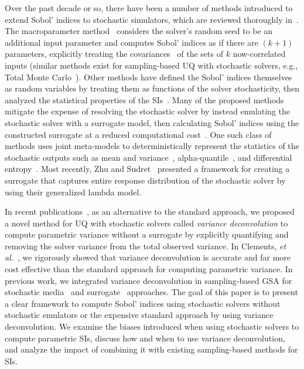 Over the past decade or so, there have been a number of methods introduced to extend Sobol' indices to stochastic simulators, which are reviewed thoroughly in~\cite{zhu-sudret-2021}.
The macroparameter method~\cite{iooss-ribatet-2009} considers the solver's random seed to be an additional input parameter and computes Sobol' indices as if there are $(k+1)$ parameters, explicitly treating the covariances~\cite{daviega-etal-2009} of the sets of $k$ now-correlated inputs (similar methods exist for sampling-based UQ with stochastic solvers, e.g., Total Monte Carlo~\cite{koning-rochman-2008, koning-rochman-2012}). 
Other methods have defined the Sobol' indices themselves as random variables by treating them as functions of the solver stochasticity, then analyzed the statistical properties of the SIs~\cite{hart-etal-2017, jimenez-etal-2017}. 
Many of the proposed methods mitigate the expense of resolving the stochastic solver by instead emulating the stochastic solver with a surrogate model, then calculating Sobol' indices using the constructed surrogate at a reduced computational cost~\cite{zhu-sudret-2021}.
One such class of methods uses joint meta-models to deterministically represent the statistics of the stochastic outputs such as mean and variance~\cite{iooss-ribatet-2009, marrel-etal-2012}, alpha-quantile~\cite{browne-etal-2016}, and differential entropy~\cite{azzi-etal-2020}.
Most recently, Zhu and Sudret~\cite{zhu-sudret-2021} presented a framework for creating a surrogate that captures entire response distribution of the stochastic solver by using their generalized lambda model.

In recent publications~\cite{olson-2019}, as an alternative to the standard approach, we proposed a novel method for UQ with stochastic solvers called \textit{variance deconvolution} to compute parametric variance without a surrogate by explicitly quantifying and removing the solver variance from the total observed variance.
In Clements, \textit{et al.}~\cite{clements-etal-2024}, we rigorously showed that variance deconvolution is accurate and far more cost effective than the standard approach for computing parametric variance. 
In previous work, we integrated variance deconvolution in sampling-based GSA for stochastic media~\cite{olson-2019} and surrogate~\cite{geraci-olson-2021, geraci-etal-2023} approaches. 
The goal of this paper is to present a clear framework to compute Sobol' indices using stochastic solvers without stochastic emulators or the expensive standard approach by using variance deconvolution. 
We examine the biases introduced when using stochastic solvers to compute parametric SIs, discuss how and when to use variance deconvolution, and analyze the impact of combining it with existing sampling-based methods for SIs.

